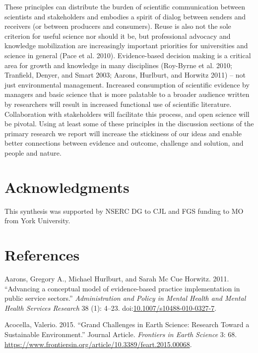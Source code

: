 \documentclass[fleqn,10pt]{wlpeerj} %
\begin{document}
These principles can distribute the burden of scientific communication
between scientists and stakeholders and embodies a spirit of dialog
between senders and receivers (or between producers and consumers).
Reuse is also not the sole criterion for useful science nor should it
be, but professional advocacy and knowledge mobilization are
increasingly important priorities for universities and science in
general (Pace et al. 2010). Evidence-based decision making is a critical
area for growth and knowledge in many disciplines (Roy-Byrne et al.
2010; Tranfield, Denyer, and Smart 2003; Aarons, Hurlburt, and Horwitz
2011) -- not just environmental management. Increased consumption of
scientific evidence by managers and basic science that is more palatable
to a broader audience written by researchers will result in increased
functional use of scientific literature. Collaboration with stakeholders
will facilitate this process, and open science will be pivotal. Using at
least some of these principles in the discussion sections of the primary
research we report will increase the stickiness of our ideas and enable
better connections between evidence and outcome, challenge and solution,
and people and nature.

\section*{Acknowledgments}\label{acknowledgments}

This synthesis was supported by NSERC DG to CJL and FGS funding to MO
from York University.

\section*{References}\label{references}

\hypertarget{refs}{}
\hypertarget{ref-Aarons2011}{}
Aarons, Gregory A., Michael Hurlburt, and Sarah Mc Cue Horwitz. 2011.
``Advancing a conceptual model of evidence-based practice implementation
in public service sectors.'' \emph{Administration and Policy in Mental
Health and Mental Health Services Research} 38 (1): 4--23.
doi:\href{https://doi.org/10.1007/s10488-010-0327-7}{10.1007/s10488-010-0327-7}.

\hypertarget{ref-Acocella2015}{}
Acocella, Valerio. 2015. ``Grand Challenges in Earth Science: Research
Toward a Sustainable Environment.'' Journal Article. \emph{Frontiers in
Earth Science} 3: 68.
\url{https://www.frontiersin.org/article/10.3389/feart.2015.00068}.
\end{document}
